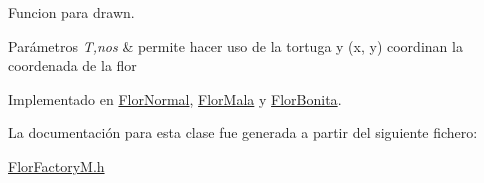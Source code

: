 Funcion para drawn. 
\begin{DoxyParams}{Parámetros}
{\em T,nos} & permite hacer uso de la tortuga y (x, y) coordinan la coordenada de la flor \\
\hline
\end{DoxyParams}


Implementado en \hyperlink{classFlorNormal_a615fc2015eeeaccd06d125d28efbd91c}{Flor\+Normal}, \hyperlink{classFlorMala_aee0f20f3aa80d9ce3cb9c6fdbf036a7c}{Flor\+Mala} y \hyperlink{classFlorBonita_a028f32ccf00bb677f54349afa49657e4}{Flor\+Bonita}.



La documentación para esta clase fue generada a partir del siguiente fichero\+:\begin{DoxyCompactItemize}
\item 
\hyperlink{FlorFactoryM_8h}{Flor\+Factory\+M.\+h}\end{DoxyCompactItemize}
